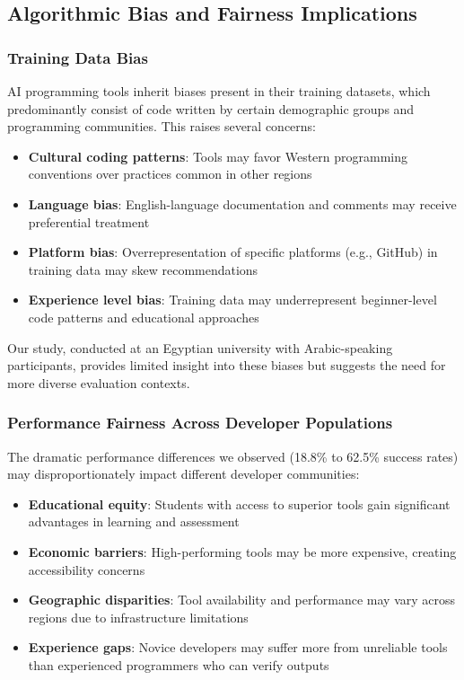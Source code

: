 \documentclass[conference]{IEEEtran}
\begin{document}
\subsection{Algorithmic Bias and Fairness Implications}

\subsubsection{Training Data Bias}
AI programming tools inherit biases present in their training datasets, which predominantly consist of code written by certain demographic groups and programming communities. This raises several concerns:

\begin{itemize}
    \item \textbf{Cultural coding patterns}: Tools may favor Western programming conventions over practices common in other regions
    \item \textbf{Language bias}: English-language documentation and comments may receive preferential treatment
    \item \textbf{Platform bias}: Overrepresentation of specific platforms (e.g., GitHub) in training data may skew recommendations
    \item \textbf{Experience level bias}: Training data may underrepresent beginner-level code patterns and educational approaches
\end{itemize}

Our study, conducted at an Egyptian university with Arabic-speaking participants, provides limited insight into these biases but suggests the need for more diverse evaluation contexts.

\subsubsection{Performance Fairness Across Developer Populations}

The dramatic performance differences we observed (18.8\% to 62.5\% success rates) may disproportionately impact different developer communities:

\begin{itemize}
    \item \textbf{Educational equity}: Students with access to superior tools gain significant advantages in learning and assessment
    \item \textbf{Economic barriers}: High-performing tools may be more expensive, creating accessibility concerns
    \item \textbf{Geographic disparities}: Tool availability and performance may vary across regions due to infrastructure limitations
    \item \textbf{Experience gaps}: Novice developers may suffer more from unreliable tools than experienced programmers who can verify outputs
\end{itemize}
\end{document}
